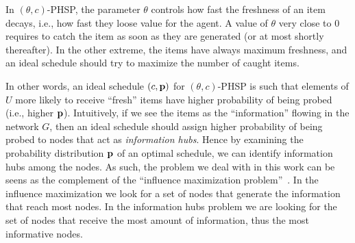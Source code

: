 In $(\theta,c)$-PHSP, the parameter $\theta$ controls how fast the freshness of
an item decays, i.e., how fast they loose value for the agent. A value of
$\theta$ very close to $0$ requires to catch the item  as soon as they are
generated (or at most shortly thereafter). In the other extreme, the items have
always maximum freshness, and an ideal schedule should try to maximize the
number of caught items. 

In other words, an ideal schedule $(c,\mathbf{p})$ for $(\theta, c)$-PHSP is such that
elements of $U$ more likely to receive ``fresh'' items have higher probability
of being probed (i.e., higher $\mathbf{p}$). Intuitively, if we see the items as the
``information'' flowing in the network $G$, then an ideal schedule should assign
higher probability of being probed to nodes that act as \emph{information hubs}.
Hence by examining the probability distribution $\mathbf{p}$ of an optimal schedule, we
can identify information hubs among the nodes. As such, the problem we deal with
in this work can be seens as the complement of the ``influence maximization
problem''~\citep{Kempe2003,Kempe2005}. In the influence maximization we look for
a set of nodes that generate the information that reach most nodes. In the
information hubs problem we are looking for the set of nodes that receive the
most amount of information, thus the most informative nodes.
